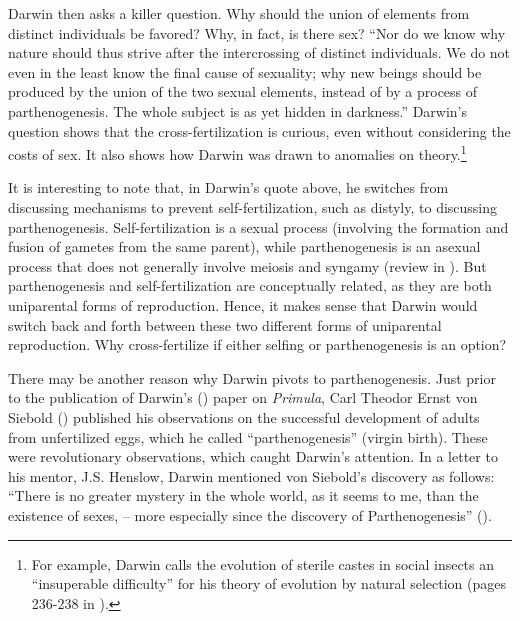 \documentclass[
  letterpaper,
]{book}
\begin{document}
Darwin then asks a killer question. Why should the union of elements
from distinct individuals be favored? Why, in fact, is there sex? ``Nor
do we know why nature should thus strive after the intercrossing of
distinct individuals. We do not even in the least know the final cause
of sexuality; why new beings should be produced by the union of the two
sexual elements, instead of by a process of parthenogenesis. The whole
subject is as yet hidden in darkness.'' Darwin's question shows that the
cross-fertilization is curious, even without considering the costs of
sex. It also shows how Darwin was drawn to anomalies on
theory.\footnote{For example, Darwin calls the evolution of sterile
  castes in social insects an ``insuperable difficulty'' for his theory
  of evolution by natural selection (pages 236-238 in
  ).}

It is interesting to note that, in Darwin's quote above, he switches
from discussing mechanisms to prevent self-fertilization, such as
distyly, to discussing parthenogenesis. Self-fertilization is a sexual
process (involving the formation and fusion of gametes from the same
parent), while parthenogenesis is an asexual process that does not
generally involve meiosis and syngamy (review in
). But parthenogenesis and
self-fertilization are conceptually related, as they are both
uniparental forms of reproduction. Hence, it makes sense that Darwin
would switch back and forth between these two different forms of
uniparental reproduction. Why cross-fertilize if either selfing or
parthenogenesis is an option?

There may be another reason why Darwin pivots to parthenogenesis. Just
prior to the publication of Darwin's ()
paper on \emph{Primula}, Carl Theodor Ernst von Siebold
() published his observations on the
successful development of adults from unfertilized eggs, which he called
``parthenogenesis'' (virgin birth). These were revolutionary
observations, which caught Darwin's attention. In a letter to his
mentor, J.S. Henslow, Darwin mentioned von Siebold's discovery as
follows: ``There is no greater mystery in the whole world, as it seems
to me, than the existence of sexes, -- more especially since the
discovery of Parthenogenesis'' ().
\end{document}

